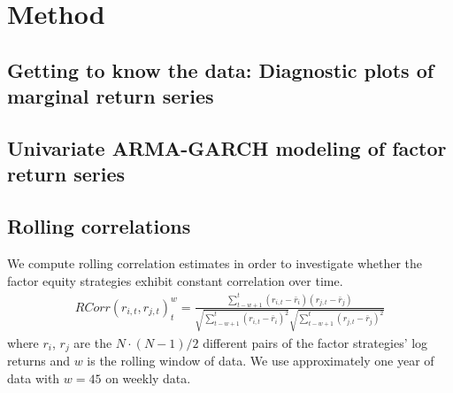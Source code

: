 \section{Method}
\subsection{Getting to know the data: Diagnostic plots of marginal return series}

\subsection{Univariate ARMA-GARCH modeling of factor return series}

\subsection{Rolling correlations}
We compute rolling correlation estimates in order to investigate whether the factor equity strategies exhibit constant correlation over time. 
\begin{align}
    RCorr(r_{i, t}, r_{j, t})_t^{w} = \frac{\sum^{t}_{t-w+1}(r_{i, t} - \bar{r}_i)(r_{j,t} - \bar{r}_j)}{\sqrt{\sum^{t}_{t-w+1} (r_{i,t} - \bar{r}_i)^2} \sqrt{\sum^{t}_{t-w+1} (r_{j,t} - \bar{r}_j)^2}}
\end{align}
where $r_i$, $r_j$ are the $N \cdot (N-1) / 2$ different pairs of the factor strategies' log returns and $w$ is the rolling window of data. We use approximately one year of data with $w = 45$ on weekly data.
